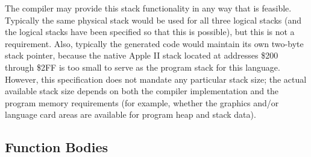 \documentclass[10pt]{article}
\begin{document}
The compiler may provide this stack functionality in any way that is
feasible.  Typically the same physical stack would be used for all
three logical stacks (and the logical stacks have been specified so
that this is possible), but this is not a requirement.  Also,
typically the generated code would maintain its own two-byte stack
pointer, because the native Apple II stack located at addresses \$200
through \$2FF is too small to serve as the program stack for this
language.  However, this specification does not mandate any particular
stack size; the actual available stack size depends on both the
compiler implementation and the program memory requirements (for
example, whether the graphics and/or language card areas are available
for program heap and stack data).

\subsection{Function Bodies}
\label{sec:code-gen:fn-bodies}
\end{document}

